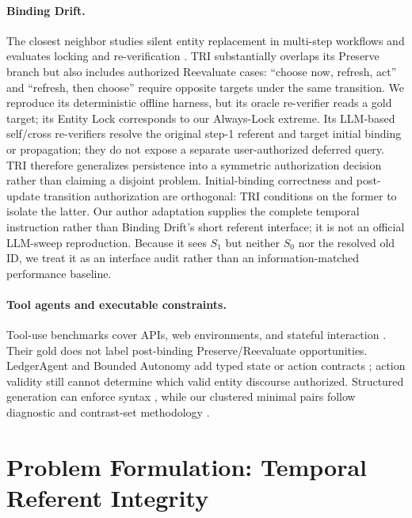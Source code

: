 \documentclass[letterpaper]{article}
\begin{document}
\paragraph{Binding Drift.}
The closest neighbor studies silent entity replacement in multi-step workflows and evaluates
locking and re-verification \cite{indukuri2026bindingdrift}. TRI substantially overlaps its Preserve
branch but also includes authorized Reevaluate cases: ``choose now, refresh, act'' and ``refresh,
then choose'' require opposite targets under the same transition. We reproduce its deterministic
offline harness, but its oracle re-verifier reads a gold target; its Entity Lock corresponds to
our Always-Lock extreme. Its LLM-based self/cross re-verifiers resolve the original step-1 referent
and target initial binding or propagation; they do not expose a separate user-authorized deferred
query. TRI therefore generalizes persistence into a symmetric authorization decision rather than
claiming a disjoint problem. Initial-binding correctness and post-update transition authorization
are orthogonal: TRI conditions on the former to isolate the latter. Our author adaptation supplies
the complete temporal instruction rather than Binding Drift's short referent interface; it is not
an official LLM-sweep reproduction. Because it sees $S_1$ but neither $S_0$ nor the resolved old
ID, we treat it as an interface audit rather than an information-matched performance baseline.

\paragraph{Tool agents and executable constraints.}
Tool-use benchmarks cover APIs, web environments, and stateful interaction
\cite{schick2023toolformer,li2023apibank,qin2024toolllm,patil2023gorilla,
liu2024agentbench,zhou2024webarena,lu2025toolsandbox,trivedi2024appworld,
yao2024taubench,barres2025tau2,sierra2026tau3}. Their gold does not label post-binding
Preserve/Reevaluate opportunities. LedgerAgent and Bounded Autonomy add typed state or action
contracts \cite{uddin2026ledgeragent,sohail2026bounded}; action validity still cannot determine
which valid entity discourse authorized. Structured generation can enforce syntax
\cite{beurer2023lmql,willard2023guided,khattab2024dspy}, while our clustered minimal pairs
follow diagnostic and contrast-set methodology \cite{ribeiro2020checklist,gardner2020contrast}.

\section{Problem Formulation: Temporal Referent Integrity}
\end{document}
